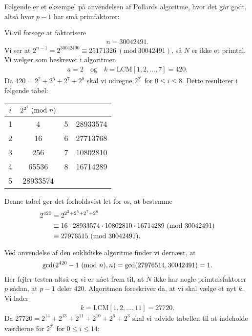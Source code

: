 Følgende er et eksempel på anvendelsen af Pollards algoritme,
hvor det går godt, altså hvor $p-1$ har små primfaktorer:

\begin{example}
Vi vil forsøge at faktorisere 
\begin{align*}
	n = 30042491.
\end{align*}
Vi ser at $2^{n-1} = 2^{30042490} \equiv 25171326 \ (\textrm{mod}\ 30042491)$,
så $N$ er ikke et primtal. Vi vælger som beskrevet i algoritmen
\begin{align*}
	a = 2 \quad \text{og} \quad k = \mathrm{LCM}[1,2, \ldots, 7] = 420.
\end{align*}
Da $420 = 2^2 + 2^5 + 2^7 + 2^8$ skal vi udregne $2^{2^i}$ for 
$0 \leq i \leq 8$. Dette resulterer i følgende tabel:

\begin{center}
\begin{tabular}{c c c c}
$i$ & $2^{2^i} \ (\mathrm{mod} \ n)$ & & \\ 
\hline 
1 & 4 & 5 & 28933574 \\ 
2 & 16 & 6 & 27713768 \\ 
3 & 256 & 7 & 10802810 \\ 
4 & 65536 & 8 & 16714289 \\ 
5 & 28933574 & & 
\end{tabular} 
\end{center}

Denne tabel gør det forholdsvist let for os, at bestemme
\begin{align*}
	2^{420} &= 2^{2^2 + 2^5 + 2^7 + 2^8} \\
	&\equiv 16 \cdot 28933574 \cdot 10802810 \cdot 16714289
	\ (\mathrm{mod} \ 30042491) \\
	&\equiv 27976515 \ (\mathrm{mod} \ 30042491).
\end{align*}

Ved anvendelse af den euklidiske algoritme finder vi dernæst, at
\begin{align*}
	\mathrm{gcd}(2^{420} - 1 \ (\mathrm{mod} \ n), n) = \mathrm{gcd}(27976514, 30042491) = 1.
\end{align*}
Her fejler testen altså og vi er nået frem til, at $N$ ikke har nogle 
primtalsfaktorer $p$ sådan, at $p-1$ deler $420$. Algoritmen foreskriver da, at vi skal vælge et nyt $k$. Vi lader
\begin{align*}
	k = \mathrm{LCM}[1,2, \ldots, 11] = 27720.
\end{align*}
Da $27720 = 2^{14} + 2^{13} + 2^{11} + 2^{10} + 2^{6} + 2^3$ skal vi udvide tabellen til at indeholde værdierne for $2^{2^i}$ for $0 \leq i \leq 14$:


\end{example}
